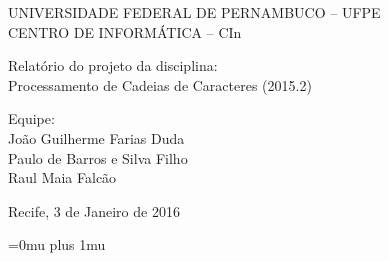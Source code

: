 \documentclass[11pt]{article}
\begin{document}
\begin{center}
UNIVERSIDADE FEDERAL DE PERNAMBUCO – UFPE\\
CENTRO DE INFORMÁTICA – CIn\\[10\baselineskip]
\end{center}

\begin{center}
Relatório do projeto da disciplina:\\
Processamento de Cadeias de Caracteres
(2015.2)\\[10\baselineskip]
\end{center}
Equipe:\\
João Guilherme Farias Duda\\
Paulo de Barros e Silva Filho\\
Raul Maia Falcão\\[8\baselineskip]


\begin{center}
Recife, 3 de Janeiro de 2016
\end{center}

\cleardoublepage

\tableofcontents

\cleardoublepage










\Urlmuskip=0mu plus 1mu\relax


\end{document}
